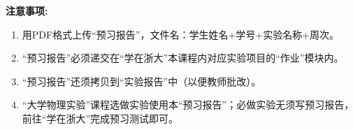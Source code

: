 {\fangsong \noindent \textbf{注意事项:}

\begin{enumerate}[label=\arabic*.]
    \item 用PDF格式上传“预习报告”，文件名：学生姓名+学号+实验名称+周次。
    \item “预习报告”必须递交在“学在浙大”本课程内对应实验项目的“作业”模块内。
    \item “预习报告”还须拷贝到“实验报告”中（以便教师批改）。
    \item “大学物理实验”课程选做实验使用本“预习报告”；必做实验无须写预习报告，前往“学在浙大”完成预习测试即可。
\end{enumerate}}
\begin{center}
\end{center}
